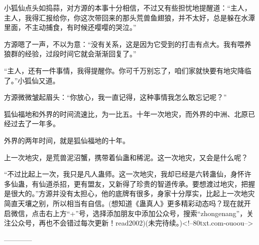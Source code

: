 \begin{this_body}
小狐仙点头如捣蒜，对方源的本事十分相信，不过又有些担忧地提醒道：“主人，主人，我得汇报给你，你这次带回来的那头荒兽鱼翅狼，并不太好，总是躲在水潭里面，不主动捕食，有时候还嘤嘤的哭泣。”

方源嗯了一声，不以为意：“没有关系，这是因为它受到的打击有点大。我有喂养狼群的经验，过段时间它就会渐渐回复了。”

“主人，还有一件事情，我得提醒你。你可千万别忘了，咱们家就快要有地灾降临了。”小狐仙又道。

方源微微皱起眉头：“你放心，我一直记得，这种事情我怎么敢忘记呢？”

狐仙福地和外界的时间流速比，为一比五。十年一次地灾，而外界的中洲、北原已经过去了一年多。

外界的两年时间，就是狐仙福地的十年。

上一次地灾，是荒兽泥沼蟹，携带着仙蛊和稀泥。这一次地灾，又会是什么呢？

“不过比起上一次，我只是凡人蛊师。这一次地灾，我却已经是六转蛊仙，身怀许多仙蛊，有仙道杀招，更有盟友，又新得了珍贵的智道传承。要想渡过地灾，把握是很大的。”方源并没有太担心，他的底牌有很多，身家十分厚实，比起上一次地灾简直天壤之别，所以相当有自信。(想知道《蛊真人》更多精彩动态吗？现在就开启微信，点击右上方“+”号，选择添加朋友中添加公众号，搜索“zhongenang”，关注公众号，再也不会错过每次更新！read2002)(未完待续。)<!--80txt.com-ouoou-->

------------

\end{this_body}

